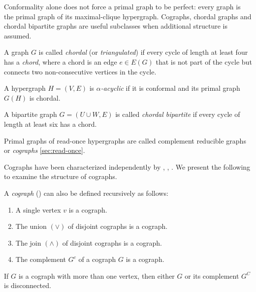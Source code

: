 Conformality alone does not force a primal graph to be perfect: every graph is the primal graph of its maximal-clique hypergraph. Cographs, chordal graphs and chordal bipartite graphs are useful subclasses when additional structure is assumed.

\begin{definition}\label{def:chordal}
A graph $G$ is called \emph{chordal} (or \emph{triangulated}) if every cycle of length at least four has a \emph{chord}, where a chord is an edge $e\in E(G)$ that is not part of the cycle but connects two non-consecutive vertices in the cycle.
\end{definition}

\begin{definition}
A hypergraph $H=(V,E)$ is \emph{$\alpha$-acyclic} if it is conformal and its primal graph $G(H)$ is chordal.
\end{definition}

\begin{definition}
A bipartite graph $G=(U\cup W,E)$ is called \emph{chordal bipartite} if every cycle of length at least six has a chord.
\end{definition}

Primal graphs of read-once hypergraphs are called complement reducible graphs or \emph{cographs} \ref{sec:read-once}.

Cographs have been characterized independently by \cite{CLB81}, \cite{Gc77}, \cite{KLN+93}. We present the following to examine the structure of cographs.

\begin{definition}
A \emph{cograph} () can also be defined recursively as follows: \cite{Cam22}
\begin{enumerate}
\item A single vertex $v$ is a cograph.
\item The union $(\vee)$ of disjoint cographs is a cograph.
\item The join $(\wedge)$ of disjoint cographs is a cograph.
\item The complement $G^c$ of a cograph $G$ is a cograph.
\end{enumerate}
\end{definition}

\begin{lemma}
If $G$ is a cograph with more than one vertex, then either $G$ or its complement $G^C$ is disconnected. \cite{CLB81}
\end{lemma}

